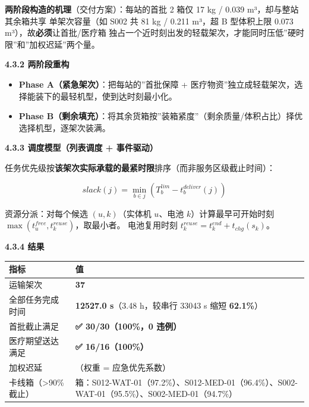 \documentclass[
  10.5pt,
]{extarticle}
\newcounter{none} %
\providecommand{\tightlist}{%
  \setlength{\itemsep}{0pt}\setlength{\parskip}{0pt}}
\begin{document}
\textbf{两阶段构造的机理}（交付方案）：每站的首批 2 箱仅 17 kg / 0.039
m³，却与整站其余箱共享 单架次容量（如 S002 共 81 kg / 0.211 m³，超 B
型体积上限 0.073 m³），故\textbf{必须}让首批/医疗箱
独占一个近时刻出发的轻载架次，才能同时压低''硬时限''和''加权迟延''两个量。

\textbf{4.3.2 两阶段重构}

\begin{itemize}
\tightlist
\item
  \textbf{Phase A（紧急架次）}：把每站的''首批保障 +
  医疗物资''独立成轻载架次，选择能装下的最轻机型，使到达时刻最小化。
\item
  \textbf{Phase
  B（剩余填充）}：将其余货箱按''装箱紧度''（剩余质量/体积占比）择优选择机型，逐架次装满。
\end{itemize}

\textbf{4.3.3 调度模型（列表调度 + 事件驱动）}

任务优先级按\textbf{该架次实际承载的最紧时限}排序（而非服务区级截止时间）：

\[slack(j)=\min_{b\in j}\left(T^{lim}_b-t^{deliver}_b(j)\right)\]

资源分派：对每个候选 \((u,k)\)（实体机 \(u\)、电池
\(k\)）计算最早可开始时刻 \(\max(t^{free}_u,t^{reuse}_k)\)，取最小者。
电池复用时刻 \(t^{reuse}_k=t^{end}_k+t_{chg}(s_k)\)。

\textbf{4.3.4 结果}

{\def\LTcaptype{none} %
\begin{longtable}[]{@{}
  >{\raggedright\arraybackslash}p{}
  >{\raggedright\arraybackslash}p{}@{}}
\toprule\noalign{}
\begin{minipage}[b]{\linewidth}\raggedright
指标
\end{minipage} & \begin{minipage}[b]{\linewidth}\raggedright
值
\end{minipage} \\
\midrule\noalign{}
\endhead
\bottomrule\noalign{}
\endlastfoot
运输架次 & \textbf{37} \\
全部任务完成时间 & \textbf{12527.0 s}（3.48 h，较串行 33043 s 缩短
\textbf{62.1\%}） \\
首批截止满足 & \textbf{✅ 30/30（100\%，0 违例）} \\
医疗期望送达满足 & \textbf{✅ 16/16（100\%）} \\
加权迟延 & 221985.2（权重 = 应急优先系数） \\
卡线箱（\textgreater90\% 截止） & 4
箱：S012-WAT-01（97.2\%）、S012-MED-01（96.4\%）、S002-WAT-01（95.5\%）、S002-MED-01（94.7\%） \\
\end{longtable}
}
\end{document}
